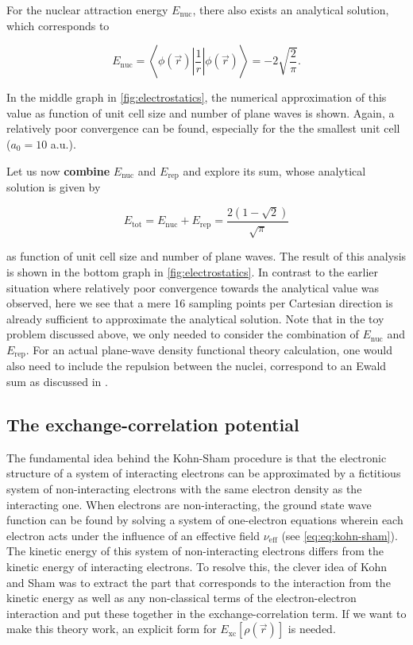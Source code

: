 For the nuclear attraction energy $E_{\text{nuc}}$, there also exists an analytical solution, which corresponds to

\begin{equation}
    E_{\text{nuc}} = \left<\phi(\vec{r})\left|\frac{1}{r}\right|\phi(\vec{r})\right> = -2\sqrt{\frac{2}{\pi}}.
\end{equation}

In the middle graph in \cref{fig:electrostatics}, the numerical approximation of this value as function of unit cell size and number of plane waves is shown. Again, a relatively poor convergence can be found, especially for the the smallest unit cell ($a_{0} = 10$ a.u.).

Let us now \textbf{combine} $E_{\text{nuc}}$ and $E_{\text{rep}}$ and explore its sum, whose analytical solution is given by

\begin{equation}
    E_{\text{tot}} = E_{\text{nuc}} + E_{\text{rep}} = \frac{2 \left( 1 - \sqrt{2} \right)}{\sqrt{\pi}}
\end{equation}

as function of unit cell size and number of plane waves. The result of this analysis is shown in the bottom graph in \cref{fig:electrostatics}. In contrast to the earlier situation where relatively poor convergence towards the analytical value was observed, here we see that a mere 16 sampling points per Cartesian direction is already sufficient to approximate the analytical solution.
Note that in the toy problem discussed above, we only needed to consider the combination of $E_{\text{nuc}}$ and $E_{\text{rep}}$. For an actual plane-wave density functional theory calculation, one would also need to include the repulsion between the nuclei, correspond to an Ewald sum as discussed in .

%
%
%
\subsection{The exchange-correlation potential}

The fundamental idea behind the Kohn-Sham procedure is that the electronic structure of a system of interacting electrons can be approximated by a fictitious system of non-interacting electrons with the same electron density as the interacting one.\cite{1965:kohn} When electrons are non-interacting, the ground state wave function can be found by solving a system of one-electron equations wherein each electron acts under the influence of an effective field $\nu_{\text{eff}}$ (see \cref{eq:eq:kohn-sham}). The kinetic energy of this system of non-interacting electrons differs from the kinetic energy of interacting electrons. To resolve this, the clever idea of Kohn and Sham was to extract the part that corresponds to the interaction from the kinetic energy as well as any non-classical terms of the electron-electron interaction and put these together in the exchange-correlation term. If we want to make this theory work, an explicit form for $E_{\textrm{xc}}[\rho(\vec{r})]$ is needed.

